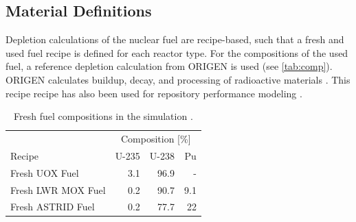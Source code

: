 \subsection{Material Definitions}
Depletion calculations of the nuclear fuel are recipe-based, such that a fresh 
and used fuel recipe is defined for each reactor type.
For the compositions of the used fuel, a reference depletion calculation
from ORIGEN is used (see \cref{tab:comp}). ORIGEN calculates buildup,
 decay, and processing of radioactive materials
\cite{parks_overview_1992}. This recipe recipe has also been used for repository performance modeling \cite{wilson_adoption_2009}.

\begin{table}[h]
    \centering
    \caption{Fresh fuel compositions in the simulation \cite{wilson_adoption_2009, varaine_pre-conceptual_2012}.}
        \begin{tabular}{lrrr}
            \hline
             & \multicolumn{3}{c}{ Composition [\%]} \\
            Recipe & U-235  & U-238  & Pu \\ 
            \hline
            Fresh \gls{UOX} Fuel & 3.1 & 96.9 & -   \\ 
            Fresh \gls{LWR} \gls{MOX} Fuel & 0.2 & 90.7 & 9.1 \\ 
            Fresh \gls{ASTRID} Fuel & 0.2 & 77.7 & 22 \\
            \hline
        \end{tabular}
        
        \label{tab:sim_result}
\end {table}
